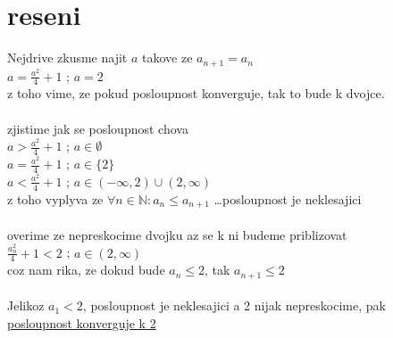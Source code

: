 \documentclass[a4paper]{article}
\def\doubleunderline#1{\underline{\underline{#1}}}
\begin{document}
\section*{reseni}
Nejdrive zkusme najit $a$ takove ze $a_{n+1} = a_n$\\
$a = \frac{a^2}{4} + 1$ ; $a = 2$\\
z toho vime, ze pokud posloupnost konverguje, tak to bude k dvojce.\\
\\
zjistime jak se posloupnost chova\\
$a > \frac{a^2}{4} + 1$ ; $a \in \emptyset$\\
$a = \frac{a^2}{4} + 1$ ; $a \in \{2\}$\\
$a < \frac{a^2}{4} + 1$ ; $a \in (-\infty , 2) \cup (2 , \infty)$\\
z toho vyplyva ze $\forall n \in \mathbb{N}: a_n \leq a_{n+1}$ \dots posloupnost je neklesajici\\
\\
overime ze nepreskocime dvojku az se k ni budeme priblizovat\\
$\frac{a^2_n}{4} + 1 < 2$ ; $a \in (2, \infty)$\\
coz nam rika, ze dokud bude $a_n\leq2$, tak $a_{n+1} \leq 2$\\
\\
Jelikoz $a_1 < 2$, posloupnost je neklesajici a 2 nijak 
nepreskocime, pak\\
\doubleunderline{posloupnost konverguje k 2}\\
\end{document}
